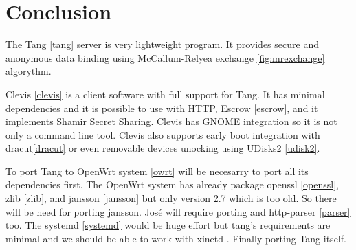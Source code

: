 \documentclass[../xdudla00-porting-Tang-to-Open-WRT.tex]{subfiles}
\begin{document}
\chapter{Conclusion}\label{conlusion}

The Tang \ref{tang} server is very lightweight program.
It provides secure and anonymous data binding using McCallum-Relyea exchange \ref{fig:mrexchange} algorythm.

Clevis \ref{clevis} is a client software with full support for Tang.
It has minimal dependencies and it is possible to use with HTTP, Escrow \ref{escrow}, and it implements Shamir Secret Sharing\cite{sss}.
Clevis has GNOME \cite{gnome} integration so it is not only a command line tool.
Clevis also supports early boot integration with dracut\ref{dracut} or even removable devices unocking using UDisks2 \ref{udisk2}.

To port Tang to OpenWrt system \ref{owrt} will be necesarry to port all its dependencies first.
The OpenWrt system has already package openssl \ref{openssl}, zlib \ref{zlib}, and jansson \ref{jansson} but only version 2.7 which is too old.
So there will be need for porting jansson. José will require porting and http-parser \ref{parser} too.
The systemd \ref{systemd} would be huge effort but tang's requirements are minimal and we should be able to
work with xinetd \cite{xinetd}. Finally porting Tang itself.
\end{document}
